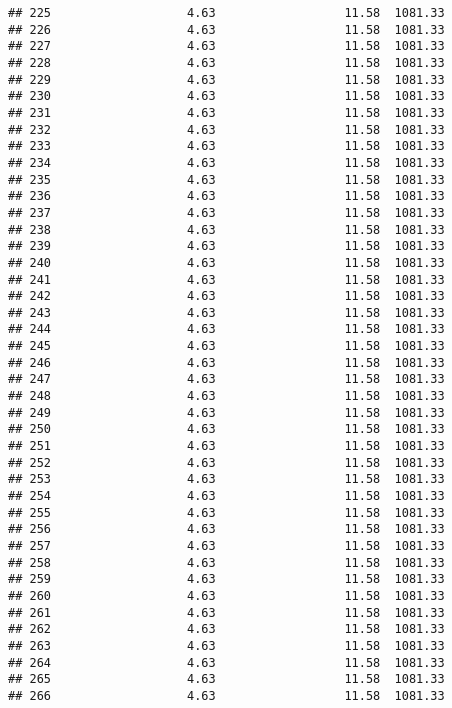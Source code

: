 \documentclass[]{article}
\begin{document}
\begin{verbatim}
## 225                   4.63                  11.58  1081.33
## 226                   4.63                  11.58  1081.33
## 227                   4.63                  11.58  1081.33
## 228                   4.63                  11.58  1081.33
## 229                   4.63                  11.58  1081.33
## 230                   4.63                  11.58  1081.33
## 231                   4.63                  11.58  1081.33
## 232                   4.63                  11.58  1081.33
## 233                   4.63                  11.58  1081.33
## 234                   4.63                  11.58  1081.33
## 235                   4.63                  11.58  1081.33
## 236                   4.63                  11.58  1081.33
## 237                   4.63                  11.58  1081.33
## 238                   4.63                  11.58  1081.33
## 239                   4.63                  11.58  1081.33
## 240                   4.63                  11.58  1081.33
## 241                   4.63                  11.58  1081.33
## 242                   4.63                  11.58  1081.33
## 243                   4.63                  11.58  1081.33
## 244                   4.63                  11.58  1081.33
## 245                   4.63                  11.58  1081.33
## 246                   4.63                  11.58  1081.33
## 247                   4.63                  11.58  1081.33
## 248                   4.63                  11.58  1081.33
## 249                   4.63                  11.58  1081.33
## 250                   4.63                  11.58  1081.33
## 251                   4.63                  11.58  1081.33
## 252                   4.63                  11.58  1081.33
## 253                   4.63                  11.58  1081.33
## 254                   4.63                  11.58  1081.33
## 255                   4.63                  11.58  1081.33
## 256                   4.63                  11.58  1081.33
## 257                   4.63                  11.58  1081.33
## 258                   4.63                  11.58  1081.33
## 259                   4.63                  11.58  1081.33
## 260                   4.63                  11.58  1081.33
## 261                   4.63                  11.58  1081.33
## 262                   4.63                  11.58  1081.33
## 263                   4.63                  11.58  1081.33
## 264                   4.63                  11.58  1081.33
## 265                   4.63                  11.58  1081.33
## 266                   4.63                  11.58  1081.33

\end{verbatim}
\end{document}
